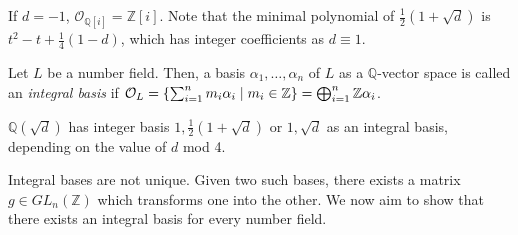 \begin{example}
    If \( d = -1 \), \( \mathcal O_{\mathbb Q[i]} = \mathbb Z[i] \).
    Note that the minimal polynomial of \( \frac{1}{2}(1+\sqrt d) \) is \( t^2 - t + \frac{1}{4}(1-d) \), which has integer coefficients as \( d \equiv 1 \).
\end{example}
\begin{definition}
    Let \( L \) be a number field.
    Then, a basis \( \alpha_1, \dots, \alpha_n \) of \( L \) as a \( \mathbb Q \)-vector space is called an \emph{integral basis} if \( \mathcal O_L = \qty{\sum_{i=1}^n m_i \alpha_i \mid m_i \in \mathbb Z} = \bigoplus_{i=1}^n \mathbb Z \alpha_i \).
\end{definition}
\begin{example}
    \( \mathbb Q(\sqrt d) \) has integer basis \( 1, \frac{1}{2}(1+\sqrt d) \) or \( 1, \sqrt d \) as an integral basis, depending on the value of \( d \) mod 4.
\end{example}
Integral bases are not unique.
Given two such bases, there exists a matrix \( g \in GL_n(\mathbb Z) \) which transforms one into the other.
We now aim to show that there exists an integral basis for every number field.

